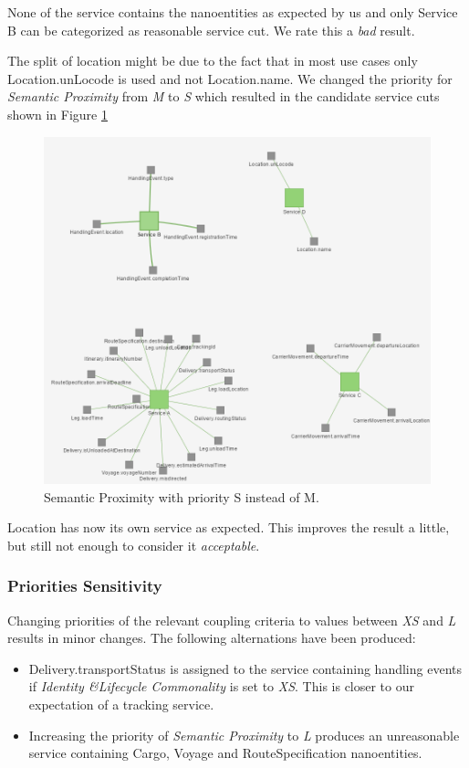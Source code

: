 None of the service contains the nanoentities as expected by us and only Service B can be categorized as reasonable service cut. We rate this a \textit{bad} result. 

The split of location might be due to the fact that in most use cases only Location.unLocode is used and not Location.name. We changed the priority for \textit{Semantic Proximity} from \textit{M} to \textit{S} which resulted in the candidate service cuts shown in Figure \ref{fig:dddGirvanNewmanS}

\begin{figure}[H]
	\includegraphics[scale=0.7]{images/ddd_girvan_4_proximity_s.png}
	\caption{Semantic Proximity with priority S instead of M.}
	\label{fig:dddGirvanNewmanS}
\end{figure}

Location has now its own service as expected. This improves the result a little, but still not enough to consider it \textit{acceptable}.

\subsubsection{Priorities Sensitivity}

Changing priorities of the relevant coupling criteria to values between \textit{XS} and \textit{L} results in minor changes. The following alternations have been produced:

\begin{itemize}
	\item Delivery.transportStatus is assigned to the service containing handling events if \textit{Identity \&Lifecycle Commonality} is set to \textit{XS}. This is closer to our expectation of a tracking service.
	\item Increasing the priority of \textit{Semantic Proximity} to \textit{L} produces an unreasonable service containing Cargo, Voyage and RouteSpecification nanoentities.
\end{itemize}

